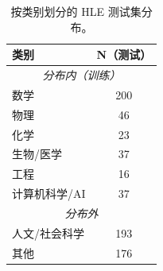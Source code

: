 \begin{table}[h]
\centering
\small
\begin{tabular}{lc}
\toprule
\textbf{类别} & \textbf{N（测试）} \\
\midrule
\multicolumn{2}{c}{\textit{分布内（训练）}} \\
\midrule
数学 & 200 \\
物理 & 46 \\
化学 & 23 \\
生物/医学 & 37 \\
工程 & 16 \\
计算机科学/AI & 37 \\
\midrule
\multicolumn{2}{c}{\textit{分布外}} \\
\midrule
人文/社会科学 & 193 \\
其他 & 176 \\
\bottomrule
\end{tabular}
\caption{按类别划分的 HLE 测试集分布。}
\label{tab:hle_categories}
\end{table}
